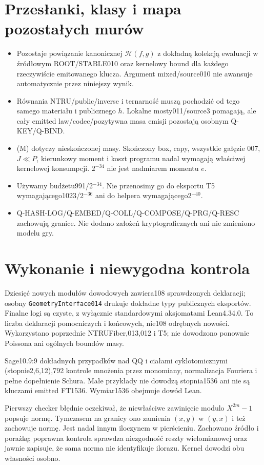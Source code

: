 \documentclass[11pt,a4paper]{article}
\newcommand{\code}[1]{\nolinkurl{#1}}
\begin{document}
\section{Przesłanki, klasy i mapa pozostałych murów}
\begin{itemize}
\item Pozostaje powiązanie kanonicznej $\mathcal H(f,g)$ z dokładną
kolekcją ewaluacji w źródłowym ROOT/STABLE010 oraz kernelowy bound dla
każdego rzeczywiście emitowanego klucza. Argument mixed/source010 nie
awansuje automatycznie przez niniejszy wynik.
\item Równania NTRU/public/inverse i ternarność muszą pochodzić od tego
samego materiału i publicznego $h$. Lokalne mosty011/source3 pomagają,
ale cały emitted law/codec/pozytywna masa emisji pozostają osobnym Q-KEY/Q-BIND.
\item(M) dotyczy nieskończonej masy. Skończony box, capy, wszystkie gałęzie
007, $J\ll P$, kierunkowy moment i koszt programu nadal wymagają właściwej
kernelowej konsumpcji. $2^{-34}$ nie jest nadmiarem momentu $e$.
\item Używamy budżetu991/2$^{-34}$. Nie przenosimy go do eksportu T5
wymagającego1023/2$^{-36}$ ani do helpera wymagającego2$^{-40}$.
\item Q-HASH-LOG/Q-EMBED/Q-COLL/Q-COMPOSE/Q-PRG/Q-RESC zachowują granice.
Nie dodano założeń kryptograficznych ani nie zmieniono modelu gry.
\end{itemize}

\section{Wykonanie i niewygodna kontrola}
Dziesięć nowych modułów dowodowych zawiera108 sprawdzonych deklaracji;
osobny \code{GeometryInterface014} drukuje dokładne typy publicznych
eksportów. Finalne logi są czyste, z wyłącznie standardowymi aksjomatami
Lean4.34.0. To liczba deklaracji pomocniczych i końcowych, nie108 odrębnych
nowości. Wykorzystano poprzednie NTRUFiber,013,012 i T5; nie dowodzono
ponownie Poissona ani ogólnych boundów masy.

Sage10.9:9 dokładnych przypadków nad QQ i ciałami cyklotomicznymi
(stopnie2,6,12),792 kontrole mnożenia przez monomiany, normalizacja
Fouriera i pełne dopełnienie Schura. Małe przykłady nie dowodzą stopnia1536
ani nie są kluczami emitted FT1536. Wymiar1536 obejmuje dowód Lean.

Pierwszy checker błędnie oczekiwał, że niewłaściwe zawinięcie modulo
$X^{2m}-1$ popsuje normę. Tymczasem na granicy ono zamienia $(x,y)$ w
$(y,x)$ i też zachowuje normę. Jest nadal innym iloczynem w pierścieniu.
Zachowano źródło i porażkę; poprawna kontrola sprawdza niezgodność
reszty wielomianowej oraz jawnie zapisuje, że sama norma nie identyfikuje
ilorazu. Kernel dowodzi obu własności osobno.
\end{document}

